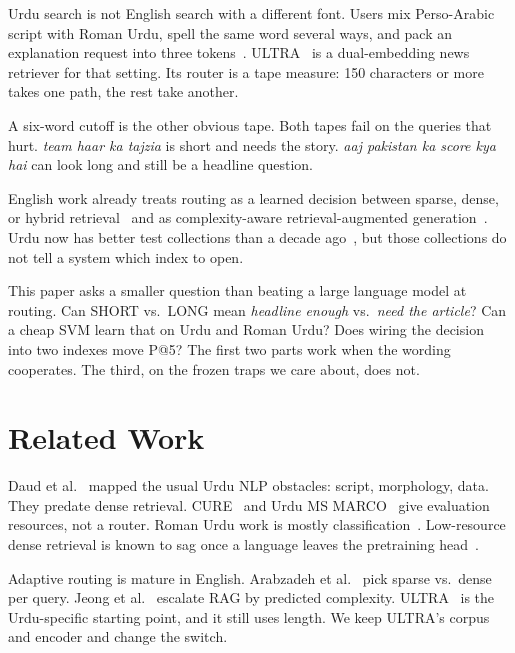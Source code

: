 \documentclass[conference]{IEEEtran}
\begin{document}
Urdu search is not English search with a different font. Users mix Perso-Arabic script with Roman Urdu, spell the same word several ways, and pack an explanation request into three tokens~\cite{daud2017urdu,hussain2025qlora}. ULTRA~\cite{bashir2026ultra} is a dual-embedding news retriever for that setting. Its router is a tape measure: 150 characters or more takes one path, the rest take another.

A six-word cutoff is the other obvious tape. Both tapes fail on the queries that hurt. \emph{team haar ka tajzia} is short and needs the story. \emph{aaj pakistan ka score kya hai} can look long and still be a headline question.

English work already treats routing as a learned decision between sparse, dense, or hybrid retrieval~\cite{arabzadeh2021predicting} and as complexity-aware retrieval-augmented generation~\cite{jeong2024adaptiverag}. Urdu now has better test collections than a decade ago~\cite{iqbal2021cure,butt2024urdumsmarco}, but those collections do not tell a system which index to open.

This paper asks a smaller question than beating a large language model at routing. Can SHORT vs.\ LONG mean \emph{headline enough} vs.\ \emph{need the article}? Can a cheap SVM learn that on Urdu and Roman Urdu? Does wiring the decision into two indexes move P@5? The first two parts work when the wording cooperates. The third, on the frozen traps we care about, does not.

\section{Related Work}

Daud et al.~\cite{daud2017urdu} mapped the usual Urdu NLP obstacles: script, morphology, data. They predate dense retrieval. CURE~\cite{iqbal2021cure} and Urdu MS MARCO~\cite{butt2024urdumsmarco} give evaluation resources, not a router. Roman Urdu work is mostly classification~\cite{hussain2025qlora,mehmood2020xtreme}. Low-resource dense retrieval is known to sag once a language leaves the pretraining head~\cite{wu2024crosslingual,conneau2020xlmr}.

Adaptive routing is mature in English. Arabzadeh et al.~\cite{arabzadeh2021predicting} pick sparse vs.\ dense per query. Jeong et al.~\cite{jeong2024adaptiverag} escalate RAG by predicted complexity. ULTRA~\cite{bashir2026ultra} is the Urdu-specific starting point, and it still uses length. We keep ULTRA's corpus and encoder and change the switch.
\end{document}
